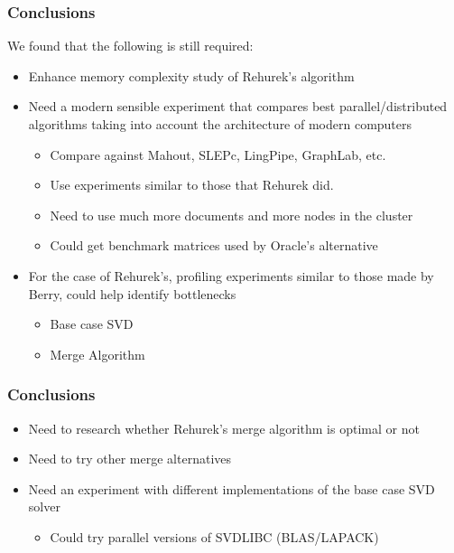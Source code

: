 \begin{frame}[plain]
\frametitle{Conclusions}
\begin{block}{}
We found that the following is still required:
\begin{itemize}
\item Enhance memory complexity study of Rehurek's algorithm
\item Need a modern sensible experiment that compares best parallel/distributed algorithms taking into account the architecture of modern computers
\begin{itemize}
\item Compare against Mahout, SLEPc, LingPipe, GraphLab, etc.
\item Use experiments similar to those that Rehurek did. 
\item Need to use much more documents and more nodes in the cluster
\item Could get benchmark matrices used by Oracle's alternative
\end{itemize}
\item For the case of Rehurek's, profiling experiments similar to those made by Berry, could help identify bottlenecks
\begin{itemize}
\item Base case SVD
\item Merge Algorithm
\end{itemize}
\end{itemize}
\end{block}
\end{frame}
\begin{frame}[plain]
\frametitle{Conclusions}
\begin{block}{}
\begin{itemize}
\item Need to research whether Rehurek's merge algorithm is optimal or not
\item Need to try other merge alternatives
\item Need an experiment with different implementations of the base case SVD solver
\begin{itemize}
\item Could try parallel versions of SVDLIBC (BLAS/LAPACK)
\end{itemize}
\end{itemize}
\end{block}
\end{frame}
